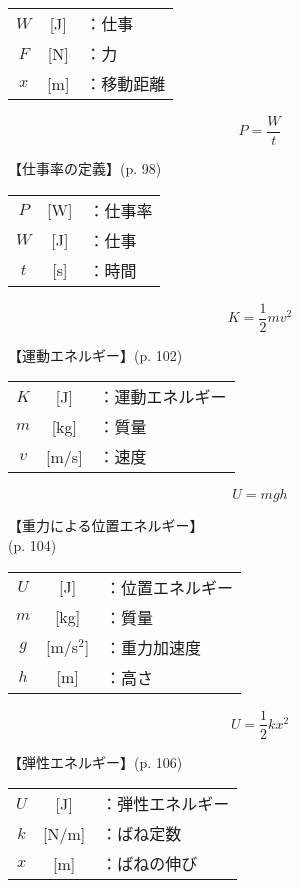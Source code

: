 \documentclass[10pt]{jarticle}
\begin{document}
\begin{tabular}{ccl}
$W$	&[J]	&：仕事\\
$F$	&[N]	&：力\\
$x$	&[m]	&：移動距離
\end{tabular}





\newpage
\[
	P = \frac{W}{t}
\]


\vskip3mm
【仕事率の定義】{\footnotesize (p. 98)}

\begin{tabular}{ccl}
$P$	&[W]	&：仕事率\\
$W$	&[J]	&：仕事\\
$t$	&[s]	&：時間
\end{tabular}




\newpage
\[
	K = \frac{1}{2} m v^2
\]


\vskip3mm
【運動エネルギー】{\footnotesize (p. 102)}

\begin{tabular}{ccl}
$K$	&[J]	&：運動エネルギー\\
$m$	&[kg]	&：質量\\
$v$	&[m/s]	&：速度
\end{tabular}





\newpage
\[
	U = mgh
\]


\vskip3mm
【重力による位置エネルギー】\\
\hfill{\footnotesize (p. 104)}

\begin{tabular}{ccl}
$U$	&[J]	&：位置エネルギー\\
$m$	&[kg]	&：質量\\
$g$	&[m/s$^2$]	&：重力加速度\\
$h$	&[m]	&：高さ
\end{tabular}





\newpage
\[
	U = \frac{1}{2} kx^2
\]


\vskip3mm
【弾性エネルギー】{\footnotesize (p. 106)}

\begin{tabular}{ccl}
$U$	&[J]	&：弾性エネルギー\\
$k$	&[N/m]	&：ばね定数\\
$x$	&[m]	&：ばねの伸び
\end{tabular}
\end{document}
